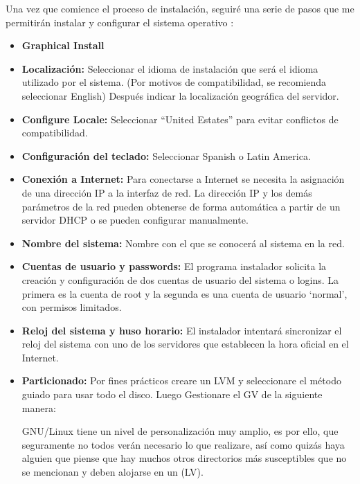 		Una vez que comience el proceso de instalación, seguiré una serie de pasos que me permitirán instalar y configurar el sistema operativo :
		
		\begin{itemize}
			
			\item \textbf{Graphical Install}
			
			\item \textbf{Localización:} Seleccionar el idioma de instalación que será el idioma utilizado por el sistema. (Por motivos de compatibilidad, se recomienda seleccionar English) Después indicar la localización geográfica del servidor.
			
			\item \textbf{Configure Locale:} Seleccionar “United Estates” para evitar conflictos de compatibilidad.
			
			\item \textbf{Configuración del teclado:} Seleccionar Spanish o Latin America.
			
			\item \textbf{Conexión a Internet:} Para conectarse a Internet se necesita la asignación de una dirección IP a la interfaz de red. La dirección IP y los demás parámetros de la red pueden obtenerse de forma automática a partir de un servidor DHCP o se pueden configurar manualmente.
			
			\item \textbf{Nombre del sistema:} Nombre con el que se conocerá al sistema en la red.
			
			\item \textbf{Cuentas de usuario y passwords:} El programa instalador solicita la creación y configuración de dos cuentas de usuario del sistema o logins. La primera es la cuenta de root y la segunda es una cuenta de usuario ‘normal’, con permisos limitados.
			
			\item \textbf{Reloj del sistema y huso horario:} El instalador intentará sincronizar el reloj del sistema con uno de los servidores que establecen la hora oficial en el Internet.
			
			\item \textbf{Particionado:} Por fines prácticos creare un LVM y seleccionare el método guiado para usar todo el disco. Luego Gestionare el GV de la siguiente manera:
			
			GNU/Linux tiene un nivel de personalización muy amplio, es por ello, que seguramente no todos verán necesario lo que realizare, así como quizás haya alguien que piense que hay muchos otros directorios más susceptibles que no se mencionan y deben alojarse en un (LV).
			

\end{itemize}
